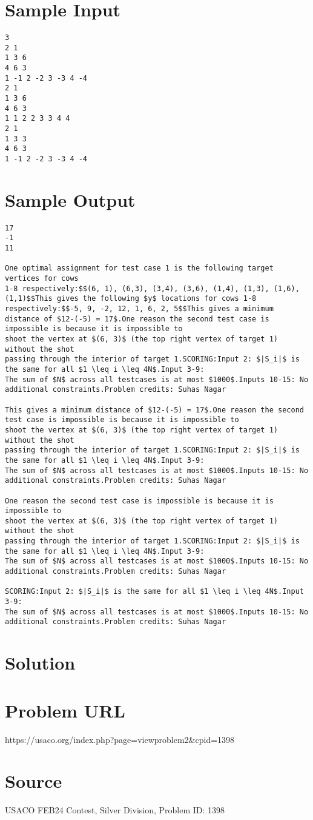 \documentclass[12pt]{article}
\begin{document}
\section*{Sample Input}
\begin{verbatim}
3
2 1
1 3 6
4 6 3
1 -1 2 -2 3 -3 4 -4
2 1
1 3 6
4 6 3
1 1 2 2 3 3 4 4
2 1
1 3 3
4 6 3
1 -1 2 -2 3 -3 4 -4
\end{verbatim}

\section*{Sample Output}
\begin{verbatim}
17
-1
11

One optimal assignment for test case 1 is the following target vertices for cows
1-8 respectively:$$(6, 1), (6,3), (3,4), (3,6), (1,4), (1,3), (1,6), (1,1)$$This gives the following $y$ locations for cows 1-8 respectively:$$-5, 9, -2, 12, 1, 6, 2, 5$$This gives a minimum distance of $12-(-5) = 17$.One reason the second test case is impossible is because it is impossible to
shoot the vertex at $(6, 3)$ (the top right vertex of target 1) without the shot
passing through the interior of target 1.SCORING:Input 2: $|S_i|$ is the same for all $1 \leq i \leq 4N$.Input 3-9:
The sum of $N$ across all testcases is at most $1000$.Inputs 10-15: No
additional constraints.Problem credits: Suhas Nagar

This gives a minimum distance of $12-(-5) = 17$.One reason the second test case is impossible is because it is impossible to
shoot the vertex at $(6, 3)$ (the top right vertex of target 1) without the shot
passing through the interior of target 1.SCORING:Input 2: $|S_i|$ is the same for all $1 \leq i \leq 4N$.Input 3-9:
The sum of $N$ across all testcases is at most $1000$.Inputs 10-15: No
additional constraints.Problem credits: Suhas Nagar

One reason the second test case is impossible is because it is impossible to
shoot the vertex at $(6, 3)$ (the top right vertex of target 1) without the shot
passing through the interior of target 1.SCORING:Input 2: $|S_i|$ is the same for all $1 \leq i \leq 4N$.Input 3-9:
The sum of $N$ across all testcases is at most $1000$.Inputs 10-15: No
additional constraints.Problem credits: Suhas Nagar

SCORING:Input 2: $|S_i|$ is the same for all $1 \leq i \leq 4N$.Input 3-9:
The sum of $N$ across all testcases is at most $1000$.Inputs 10-15: No
additional constraints.Problem credits: Suhas Nagar
\end{verbatim}

\section*{Solution}


\section*{Problem URL}
https://usaco.org/index.php?page=viewproblem2&cpid=1398

\section*{Source}
USACO FEB24 Contest, Silver Division, Problem ID: 1398
\end{document}
